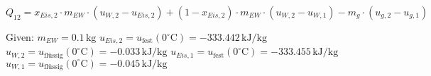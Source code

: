 \( Q_{12} = x_{Eis,2} \cdot m_{EW} \cdot (u_{W,2} - u_{Eis,2}) + (1 - x_{Eis,2}) \cdot m_{EW} \cdot (u_{W,2} - u_{W,1}) - m_g \cdot (u_{g,2} - u_{g,1}) \)  

Given:  
\( m_{EW} = 0.1 \, \text{kg} \)  
\( u_{Eis,2} = u_{\text{fest}} (0^\circ \text{C}) = -333.442 \, \text{kJ/kg} \)  
\( u_{W,2} = u_{\text{flüssig}} (0^\circ \text{C}) = -0.033 \, \text{kJ/kg} \)  
\( u_{Eis,1} = u_{\text{fest}} (0^\circ \text{C}) = -333.455 \, \text{kJ/kg} \)  
\( u_{W,1} = u_{\text{flüssig}} (0^\circ \text{C}) = -0.045 \, \text{kJ/kg} \)